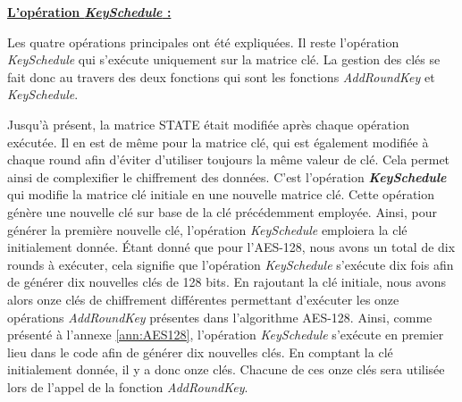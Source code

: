 \documentclass[oneside]{book}
\begin{document}
\newpage
\underline{\textbf{L'opération \textit{KeySchedule} :}}

\vspace{0.1cm}Les quatre opérations principales ont été expliquées. Il reste l'opération \textit{KeySchedule} qui s'exécute uniquement sur la matrice clé. La gestion des clés se fait donc au travers des deux fonctions qui sont les fonctions \textit{AddRoundKey} et \textit{KeySchedule}.

\hspace{-0.5cm}Jusqu'à présent, la matrice STATE était modifiée après chaque opération exécutée. Il en est de même pour la matrice clé, qui est également modifiée à chaque round afin d'éviter d'utiliser toujours la même valeur de clé. Cela permet ainsi de complexifier le chiffrement des données. C'est l'opération \textbf{\textit{KeySchedule}} qui modifie la matrice clé initiale en une nouvelle matrice clé. Cette opération génère une nouvelle clé sur base de la clé précédemment employée. Ainsi, pour générer la première nouvelle clé, l'opération \textit{KeySchedule} emploiera la clé initialement donnée. Étant donné que pour l'AES-128, nous avons un total de dix rounds à exécuter, cela signifie que l'opération \textit{KeySchedule} s'exécute dix fois afin de générer dix nouvelles clés de 128 bits. En rajoutant la clé initiale, nous avons alors onze clés de chiffrement différentes permettant d'exécuter les onze opérations \textit{AddRoundKey} présentes dans l'algorithme AES-128. Ainsi, comme présenté à l'annexe \ref{ann:AES128}, l'opération \textit{KeySchedule} s'exécute en premier lieu dans le code afin de générer dix nouvelles clés. En comptant la clé initialement donnée, il y a donc onze clés. Chacune de ces onze clés sera utilisée lors de l'appel de la fonction \textit{AddRoundKey}. 
\end{document}
